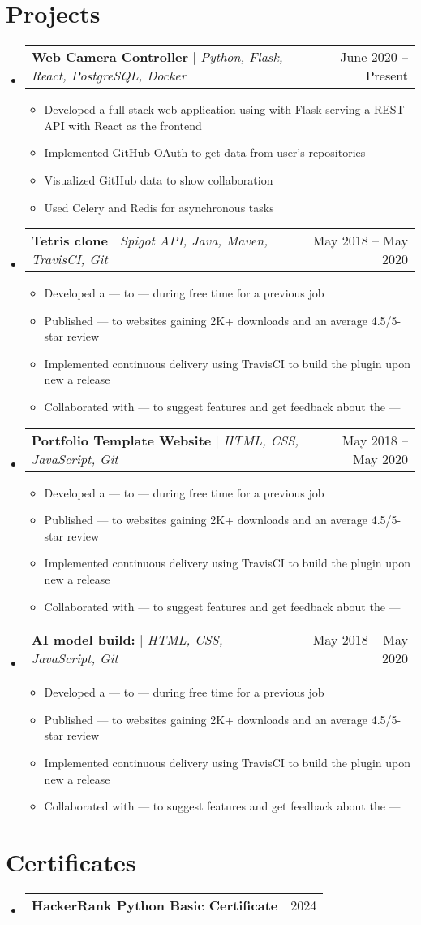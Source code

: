 \documentclass[letterpaper,11pt]{article}
\makeatletter
\newcommand{\resumeItem}[1]{
  \item\small{
    {#1 \vspace{-2pt}}
  }
}
\newcommand{\resumeProjectHeading}[2]{
    \item
    \begin{tabular*}{0.97\textwidth}{l@{\extracolsep{\fill}}r@{\hspace{-0.2in}}}
        \small#1 & #2 \\
    \end{tabular*}\vspace{-7pt}
}
\newcommand{\resumeSubHeadingListStart}{\begin{itemize}[leftmargin=0.00in, rightmargin=-0.2in, label={}]}
\newcommand{\resumeSubHeadingListEnd}{\end{itemize}}
\newcommand{\resumeItemListStart}{\begin{itemize}}
\newcommand{\resumeItemListEnd}{\end{itemize}\vspace{-5pt}}
\makeatother
\begin{document}
\section{Projects}
    \resumeSubHeadingListStart
        \resumeProjectHeading
            {\textbf{Web Camera Controller} $|$ \emph{Python, Flask, React, PostgreSQL, Docker}}{June 2020 -- Present}
            \resumeItemListStart
                \resumeItem{Developed a full-stack web application using with Flask serving a REST API with React as the frontend}
                \resumeItem{Implemented GitHub OAuth to get data from user’s repositories}
                \resumeItem{Visualized GitHub data to show collaboration}
                \resumeItem{Used Celery and Redis for asynchronous tasks}
            \resumeItemListEnd
        \resumeProjectHeading
            {\textbf{Tetris clone} $|$ \emph{Spigot API, Java, Maven, TravisCI, Git}}{May 2018 -- May 2020}
            \resumeItemListStart
                \resumeItem{Developed a --- to --- during free time for a previous job}
                \resumeItem{Published --- to websites gaining 2K+ downloads and an average 4.5/5-star review}
                \resumeItem{Implemented continuous delivery using TravisCI to build the plugin upon new a release}
                \resumeItem{Collaborated with --- to suggest features and get feedback about the ---}
            \resumeItemListEnd
        \resumeProjectHeading
            {\textbf{Portfolio Template Website} $|$ \emph{HTML, CSS, JavaScript, Git}}{May 2018 -- May 2020}
            \resumeItemListStart
                \resumeItem{Developed a --- to --- during free time for a previous job}
                \resumeItem{Published --- to websites gaining 2K+ downloads and an average 4.5/5-star review}
                \resumeItem{Implemented continuous delivery using TravisCI to build the plugin upon new a release}
                \resumeItem{Collaborated with --- to suggest features and get feedback about the ---}
            \resumeItemListEnd
        \resumeProjectHeading
            {\textbf{AI model build: } $|$ \emph{HTML, CSS, JavaScript, Git}}{May 2018 -- May 2020}
            \resumeItemListStart
                \resumeItem{Developed a --- to --- during free time for a previous job}
                \resumeItem{Published --- to websites gaining 2K+ downloads and an average 4.5/5-star review}
                \resumeItem{Implemented continuous delivery using TravisCI to build the plugin upon new a release}
                \resumeItem{Collaborated with --- to suggest features and get feedback about the ---}
            \resumeItemListEnd
    \resumeSubHeadingListEnd
    
\section{Certificates}
    \resumeSubHeadingListStart
        \resumeProjectHeading
            {\textbf{HackerRank Python Basic Certificate}}{2024}
        \resumeSubHeadingListEnd
\end{document}
